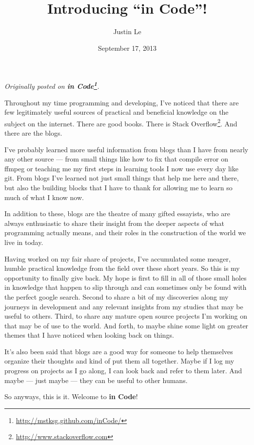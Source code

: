 \documentclass[]{article}
\title{Introducing ``in Code''!}
\author{Justin Le}
\date{September 17, 2013}
\renewcommand{\href}[2]{#2\footnote{\url{#1}}}
\begin{document}
\maketitle

\emph{Originally posted on
\textbf{\href{http://mstksg.github.com/inCode/}{in Code}}.}

Throughout my time programming and developing, I've noticed that there
are few legitimately useful sources of practical and beneficial
knowledge on the subject on the internet. There are good books. There is
\href{http://www.stackoverflow.com}{Stack Overflow}. And there are the
blogs.

I've probably learned more useful information from blogs than I have
from nearly any other source --- from small things like how to fix that
compile error on ffmpeg or teaching me my first steps in learning tools
I now use every day like git. From blogs I've learned not just small
things that help me here and there, but also the building blocks that I
have to thank for allowing me to learn so much of what I know now.

In addition to these, blogs are the theatre of many gifted essayists,
who are always enthusiastic to share their insight from the deeper
aspects of what programming actually means, and their roles in the
construction of the world we live in today.

Having worked on my fair share of projects, I've accumulated some
meager, humble practical knowledge from the field over these short
years. So this is my opportunity to finally give back. My hope is first
to fill in all of those small holes in knowledge that happen to slip
through and can sometimes only be found with the perfect google search.
Second to share a bit of my discoveries along my journeys in development
and any relevant insights from my studies that may be useful to others.
Third, to share any mature open source projects I'm working on that may
be of use to the world. And forth, to maybe shine some light on greater
themes that I have noticed when looking back on things.

It's also been said that blogs are a good way for someone to help
themselves organize their thoughts and kind of put them all together.
Maybe if I log my progress on projects as I go along, I can look back
and refer to them later. And maybe --- just maybe --- they can be useful
to other humans.

So anyways, this is it. Welcome to \textbf{in Code}!
\end{document}
